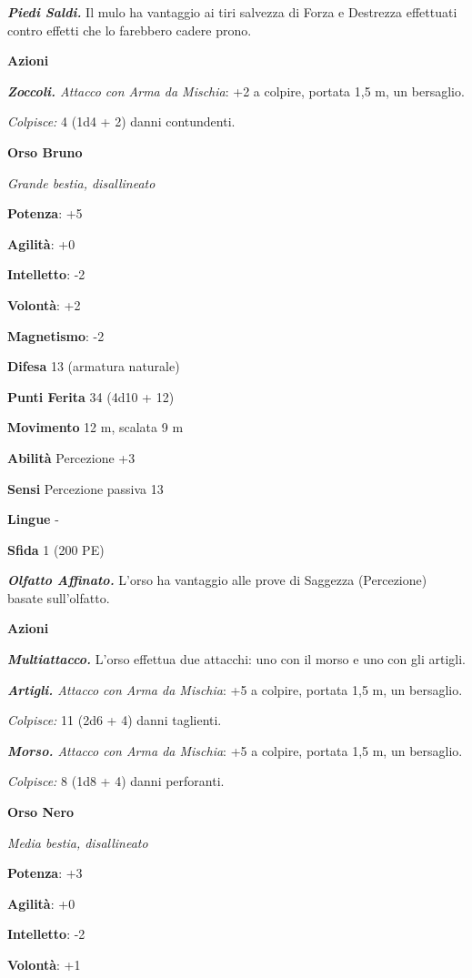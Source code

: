 \begin{multicols}{2}
\emph{\textbf{Piedi Saldi.}} Il mulo ha vantaggio ai tiri salvezza di
Forza e Destrezza effettuati contro effetti che lo farebbero cadere
prono.

\textbf{Azioni}

\emph{\textbf{Zoccoli.} Attacco con Arma da Mischia}: +2 a colpire,
portata 1,5 m, un bersaglio.

\emph{Colpisce:} 4 (1d4 + 2) danni contundenti.

\textbf{Orso Bruno}

\emph{Grande bestia, disallineato}

\textbf{Potenza}: +5

\textbf{Agilità}: +0

\textbf{Intelletto}: -2

\textbf{Volontà}: +2

\textbf{Magnetismo}: -2

\textbf{Difesa} 13 (armatura naturale)

\textbf{Punti Ferita} 34 (4d10 + 12)

\textbf{Movimento} 12 m, scalata 9 m

\textbf{Abilità} Percezione +3

\textbf{Sensi} Percezione passiva 13

\textbf{Lingue} -

\textbf{Sfida} 1 (200 PE)

\emph{\textbf{Olfatto Affinato.}} L'orso ha vantaggio alle prove di
Saggezza (Percezione) basate sull'olfatto.

\textbf{Azioni}

\emph{\textbf{Multiattacco.}} L'orso effettua due attacchi: uno con il
morso e uno con gli artigli.

\emph{\textbf{Artigli.} Attacco con Arma da Mischia}: +5 a colpire,
portata 1,5 m, un bersaglio.

\emph{Colpisce:} 11 (2d6 + 4) danni taglienti.

\emph{\textbf{Morso.} Attacco con Arma da Mischia}: +5 a colpire,
portata 1,5 m, un bersaglio.

\emph{Colpisce:} 8 (1d8 + 4) danni perforanti.

\textbf{Orso Nero}

\emph{Media bestia, disallineato}

\textbf{Potenza}: +3

\textbf{Agilità}: +0

\textbf{Intelletto}: -2

\textbf{Volontà}: +1


\end{multicols}

